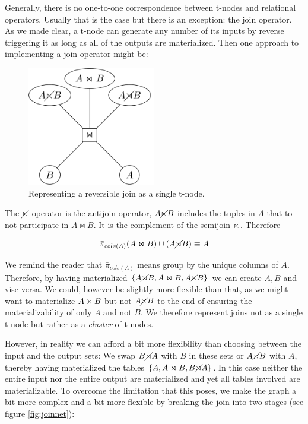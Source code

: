 Generally, there is no one-to-one correspondence between
t-nodes and relational operators. Usually that is the case but
there is an exception: the join operator. As we made clear, a t-node
can generate any number of its inputs by reverse triggering it as
long as all of the outputs are materialized. Then one approach to
implementing a join operator might be:

\begin{figure}[H]
  \centering
  \includegraphics[width=0.5\textwidth]{./imgs/naivejoinnet.pdf}
  \caption{\label{fig:org78bb458}Representing a reversible join as a single t-node.}
\end{figure}

The \(\cancel\ltimes\) operator is the antijoin operator, \(A \cancel\ltimes B\)
includes the tuples in \(A\) that to not participate in \(A \Join B\). It
is the complement of the semijoin \(\ltimes\). Therefore

\[ \bar{\pi}_{cols(A)}(A \Join B) \cup (A \cancel\rtimes B) \equiv A \]

We remind the reader that \(\bar{\pi}_{cols(A)}\) means group by the
unique columns of \(A\). Therefore, by having materialized \(\{A \cancel\rtimes B, A
\Join B, A \cancel\ltimes B\}\) we can create \({A,B}\) and vise versa. We could,
however be slightly more flexible than that, as we might want to
materialize \(A \rtimes B\) but not \(A \cancel\ltimes B\) to the end of ensuring
the materializability of only \(A\) and not \(B\). We therefore
represent joins not as a single t-node but rather as a \emph{cluster} of
t-nodes.

However, in reality we can afford a bit more flexibility than
choosing between the input and the output sets: We swap \(B \cancel\rtimes A\)
with \(B\) in these sets or \(A \cancel\rtimes B\) with \(A\), thereby having
materialized the tables \(\{A, A \Join B, B \cancel\rtimes A\}\). In this case
neither the entire input nor the entire output are materialized
and yet all tables involved are materializable. To overcome the
limitation that this poses, we make the graph a bit more complex
and a bit more flexible by breaking the join into two stages (see
figure \ref{fig:joinnet}):

